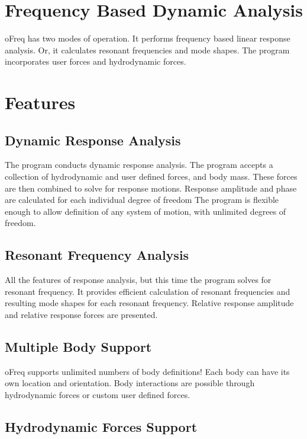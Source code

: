 \section*{Frequency Based Dynamic Analysis}



o\-Freq has two modes of operation. It performs frequency based linear response analysis. Or, it calculates resonant frequencies and mode shapes. The program incorporates user forces and hydrodynamic forces.

\section*{Features}

\subsection*{Dynamic Response Analysis}

The program conducts dynamic response analysis. The program accepts a collection of hydrodynamic and user defined forces, and body mass. These forces are then combined to solve for response motions. Response amplitude and phase are calculated for each individual degree of freedom The program is flexible enough to allow definition of any system of motion, with unlimited degrees of freedom.

\subsection*{Resonant Frequency Analysis}

All the features of response analysis, but this time the program solves for resonant frequency. It provides efficient calculation of resonant frequencies and resulting mode shapes for each resonant frequency. Relative response amplitude and relative response forces are presented.

\subsection*{Multiple Body Support}

o\-Freq supports unlimited numbers of body definitions! Each body can have its own location and orientation. Body interactions are possible through hydrodynamic forces or custom user defined forces.

\subsection*{Hydrodynamic Forces Support}

